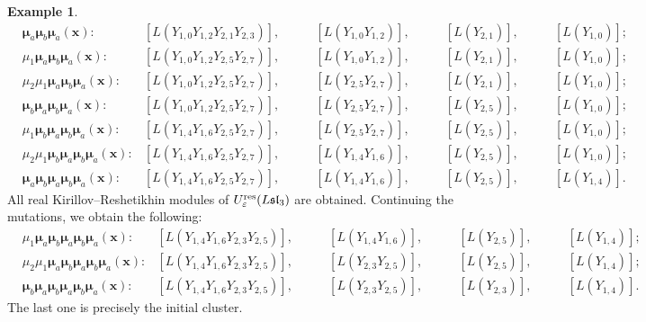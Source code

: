 \documentclass[11pt, reqno]{amsart}
\theoremstyle{plain}
\theoremstyle{definition}
\newtheorem{example}[theorem]{Example}
\numberwithin{equation}{section}
\newcommand{\res}{{\rm res}}
\begin{document}
\begin{example}
\begin{align*}
&\boldsymbol{\mu}_a\boldsymbol{\mu}_b\boldsymbol{\mu}_a(\mathbf{x}):  &[L(Y_{1,0}Y_{1,2}Y_{2,1}Y_{2,3})], \quad\quad &[L(Y_{1,0}Y_{1,2})],  \quad\quad  &[L(Y_{2,1})], \quad\quad &[L(Y_{1,0})];\\
&\mu_1\boldsymbol{\mu}_a\boldsymbol{\mu}_b\boldsymbol{\mu}_a(\mathbf{x}):  &[L(Y_{1,0}Y_{1,2}Y_{2,5}Y_{2,7})], \quad\quad &[L(Y_{1,0}Y_{1,2})],  \quad\quad  &[L(Y_{2,1})], \quad\quad &[L(Y_{1,0})];\\
&\mu_2\mu_1\boldsymbol{\mu}_a\boldsymbol{\mu}_b\boldsymbol{\mu}_a(\mathbf{x}):  &[L(Y_{1,0}Y_{1,2}Y_{2,5}Y_{2,7})], \quad\quad &[L(Y_{2,5}Y_{2,7})],  \quad\quad  &[L(Y_{2,1})], \quad\quad &[L(Y_{1,0})];\\
&\boldsymbol{\mu}_b\boldsymbol{\mu}_a\boldsymbol{\mu}_b\boldsymbol{\mu}_a(\mathbf{x}):  &[L(Y_{1,0}Y_{1,2}Y_{2,5}Y_{2,7})], \quad\quad &[L(Y_{2,5}Y_{2,7})],  \quad\quad  &[L(Y_{2,5})], \quad\quad &[L(Y_{1,0})];\\
&\mu_1\boldsymbol{\mu}_b\boldsymbol{\mu}_a\boldsymbol{\mu}_b\boldsymbol{\mu}_a(\mathbf{x}):  &[L(Y_{1,4}Y_{1,6}Y_{2,5}Y_{2,7})], \quad\quad &[L(Y_{2,5}Y_{2,7})],  \quad\quad  &[L(Y_{2,5})], \quad\quad &[L(Y_{1,0})];\\
&\mu_2\mu_1\boldsymbol{\mu}_b\boldsymbol{\mu}_a\boldsymbol{\mu}_b\boldsymbol{\mu}_a(\mathbf{x}):  &[L(Y_{1,4}Y_{1,6}Y_{2,5}Y_{2,7})], \quad\quad &[L(Y_{1,4}Y_{1,6})],  \quad\quad  &[L(Y_{2,5})], \quad\quad &[L(Y_{1,0})];\\
&\boldsymbol{\mu}_a\boldsymbol{\mu}_b\boldsymbol{\mu}_a\boldsymbol{\mu}_b\boldsymbol{\mu}_a(\mathbf{x}):  &[L(Y_{1,4}Y_{1,6}Y_{2,5}Y_{2,7})], \quad\quad &[L(Y_{1,4}Y_{1,6})],  \quad\quad  &[L(Y_{2,5})], \quad\quad &[L(Y_{1,4})].
\end{align*}
All real Kirillov--Reshetikhin modules of $U_\varepsilon^\res({L\mathfrak{sl}_{3}})$ are obtained. 
Continuing the mutations, we obtain the following:
\begin{align*}
&\mu_1\boldsymbol{\mu}_a\boldsymbol{\mu}_b\boldsymbol{\mu}_a\boldsymbol{\mu}_b\boldsymbol{\mu}_a(\mathbf{x}):  &[L(Y_{1,4}Y_{1,6}Y_{2,3}Y_{2,5})], \quad\quad &[L(Y_{1,4}Y_{1,6})],\quad\quad  &[L(Y_{2,5})], \quad\quad  &[L(Y_{1,4})];\\
&\mu_2\mu_1\boldsymbol{\mu}_a\boldsymbol{\mu}_b\boldsymbol{\mu}_a\boldsymbol{\mu}_b\boldsymbol{\mu}_a(\mathbf{x}):  &[L(Y_{1,4}Y_{1,6}Y_{2,3}Y_{2,5})], \quad\quad &[L(Y_{2,3}Y_{2,5})],\quad\quad  &[L(Y_{2,5})], \quad\quad  &[L(Y_{1,4})];\\
&\boldsymbol{\mu}_b\boldsymbol{\mu}_a\boldsymbol{\mu}_b\boldsymbol{\mu}_a\boldsymbol{\mu}_b\boldsymbol{\mu}_a(\mathbf{x}):  &[L(Y_{1,4}Y_{1,6}Y_{2,3}Y_{2,5})], \quad\quad &[L(Y_{2,3}Y_{2,5})],\quad\quad  &[L(Y_{2,3})], \quad\quad  &[L(Y_{1,4})].
\end{align*}
The last one is precisely the initial cluster.
\end{example}
\end{document}

